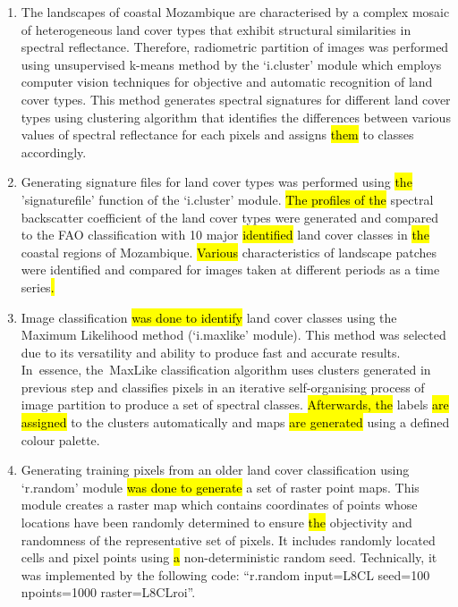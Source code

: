\documentclass[coasts,article,accept,pdftex,oneauthor]{Definitions/mdpi}
\begin{document}
\begin{enumerate}
{''. Here, each band was selected for each of the RGB triplets (red, green and blue) which enabled to visualise the images in various combinations (natural and false colour composites)}. 
  \item {The landscapes of coastal Mozambique are characterised by a complex mosaic of heterogeneous land cover types that\hl{ }exhibit structural similarities in spectral reflectance. Therefore, }radiometric {partition of images was performed} using unsupervised k-means method {by the }`i.cluster' module {which employs computer vision techniques for objective and automatic recognition of land cover types. This method generates spectral signatures for different land cover types using clustering algorithm that identifies the differences between various values of spectral reflectance for each pixels and assigns \hl{them} to classes accordingly.}
    \item Generating signature files for land cover types {was performed }using \hl{the }'signaturefile' function of the `i.cluster' module. \hl{The profiles of the }spectral backscatter coefficient\hl{ }of the land cover types were generated and compared to {the }FAO classification with 10 major \hl{identified} land cover classes{\hl{ }in \hl{the }coastal regions of Mozambique}. \hl{Various} characteristics of landscape patches were identified and compared for\hl{ }images taken at different {periods as a time series}\hl{.}
  \item Image classification {\hl{was done to identify }land cover classes }using the Maximum Likelihood method (`i.maxlike' module). {This method was selected due to its versatility and ability to produce fast and accurate results. In~essence, the~MaxLike classification algorithm uses clusters generated in previous step and classifies pixels\hl{ }in an iterative self-organising process of image partition to produce a set of spectral classes. \hl{Afterwards, the}  labels \hl{are assigned }to the clusters automatically and\hl{ }maps \hl{are generated }using a defined colour palette}.
  \item Generating training pixels from an older land cover classification using `r.random' module \hl{was done to generate }a set of raster point maps. {This module creates a raster map which contains coordinates of points whose locations have been randomly determined to ensure \hl{the }objectivity and randomness of the representative set of pixels.\hl{ }It } includes randomly located cells and pixel points using \hl{a} non-deterministic random seed. {Technically, it was implemented by the following code: ``r.random input=L8CL seed=100 npoints=1000 raster=L8CLroi''.}

\end{enumerate}
\end{document}
